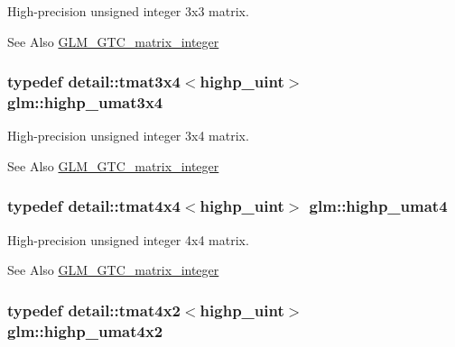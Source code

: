 High-\/precision unsigned integer 3x3 matrix. 

\begin{DoxySeeAlso}{See Also}
\hyperlink{group__gtc__matrix__integer}{G\-L\-M\-\_\-\-G\-T\-C\-\_\-matrix\-\_\-integer} 
\end{DoxySeeAlso}
\hypertarget{group__gtc__matrix__integer_ga6fd3ea8bf5ccfc7548bbf3e687a05022}{
\subsubsection[{highp\-\_\-umat3x4}]{\setlength{\rightskip}{0pt plus 5cm}typedef detail\-::tmat3x4$<$highp\-\_\-uint$>$ {\bf glm\-::highp\-\_\-umat3x4}}}\label{group__gtc__matrix__integer_ga6fd3ea8bf5ccfc7548bbf3e687a05022}


High-\/precision unsigned integer 3x4 matrix. 

\begin{DoxySeeAlso}{See Also}
\hyperlink{group__gtc__matrix__integer}{G\-L\-M\-\_\-\-G\-T\-C\-\_\-matrix\-\_\-integer} 
\end{DoxySeeAlso}
\hypertarget{group__gtc__matrix__integer_gabf91e4747e9aad3d2b58c79da5d9b0d3}{
\subsubsection[{highp\-\_\-umat4}]{\setlength{\rightskip}{0pt plus 5cm}typedef detail\-::tmat4x4$<$highp\-\_\-uint$>$ {\bf glm\-::highp\-\_\-umat4}}}\label{group__gtc__matrix__integer_gabf91e4747e9aad3d2b58c79da5d9b0d3}


High-\/precision unsigned integer 4x4 matrix. 

\begin{DoxySeeAlso}{See Also}
\hyperlink{group__gtc__matrix__integer}{G\-L\-M\-\_\-\-G\-T\-C\-\_\-matrix\-\_\-integer} 
\end{DoxySeeAlso}
\hypertarget{group__gtc__matrix__integer_gaa9500361295c8c2fd8bee2b77491a405}{
\subsubsection[{highp\-\_\-umat4x2}]{\setlength{\rightskip}{0pt plus 5cm}typedef detail\-::tmat4x2$<$highp\-\_\-uint$>$ {\bf glm\-::highp\-\_\-umat4x2}}}\label{group__gtc__matrix__integer_gaa9500361295c8c2fd8bee2b77491a405}


